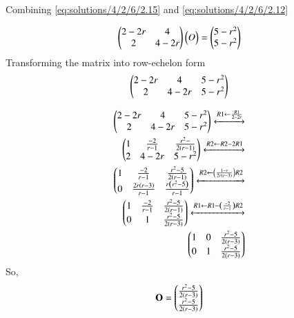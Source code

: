 Combining \ref{eq:solutions/4/2/6/2.15} and \ref{eq:solutions/4/2/6/2.12}

\begin{align}
\begin{pmatrix}2 - 2r  &  4 \\   2 & 4 - 2r \\\end{pmatrix} \begin{pmatrix}O\end{pmatrix} = \begin{pmatrix}5 - r^2 \\ 5 - r^2 \\\end{pmatrix} \label{eq:solutions/4/2/6/2.17}
\end{align}
Transforming the matrix into row-echelon form \\
\begin{align}
\begin{pmatrix}2 - 2r  &  4 &  5 - r^2 \\   2 & 4 - 2r &  5 - r^2 \\\end{pmatrix}  \label{eq:solutions/4/2/6/2.18}
\end{align}

	\begin{align}
\myvec{
	2 - 2r & 4 & 5 - r^2 \\
	2 & 4 - 2r & 5 - r^2 \\
}
\xleftrightarrow[]{R1 \leftarrow \frac{R1}{2 - 2r} } \nonumber  \\
%
\myvec{
	1 & \frac{-2}{r-1} & \frac{r^2 - }{2\left( r - 1\right)} \\
	2 & 4 - 2r & 5 - r^2\\
}
\xleftrightarrow[]{R2 \leftarrow  R2 - 2R1 } \nonumber  \\
%
\myvec{
	1 & \frac{-2}{r - 1} & \frac{r^2 - 5}{2 \left( r - 1 \right)} \\
	0 & \frac{2r\left(r - 3 \right) }{ r - 1} & \frac{r \left(r^2 - 5 \right)}{r - 1}
}
\xleftrightarrow[]{R2 \leftarrow \left( \frac{1 - r}{ 2r \left( r - 3\right)}\right)R2 } \nonumber  \\
%	
\myvec{
	1 & \frac{-2}{r - 1} & \frac{r^2 - 5}{2 \left(r - 1\right)} \\
	0 & 1 & \frac{r^2 - 5}{2 \left(r - 3\right)}
}
\xleftrightarrow[]{R1 \leftarrow  R1 - \left( \frac{-2}{r - 1} \right)R2 } \nonumber   \\
\myvec{
	1 & 0 & \frac{r^2 - 5}{2 \left(r - 3\right)} \\
	0 & 1 & \frac{r^2 - 5}{2 \left(r - 3\right)}
}
\end{align}
So,
\begin{align}
\mathbf{O} = \begin{pmatrix} \frac{r^2 - 5}{2 \left(r - 3\right)} \\ \frac{r^2 - 5}{2 \left(r - 3\right)} \\\end{pmatrix} \label{eq:solutions/4/2/6/2.19}
\end{align}



